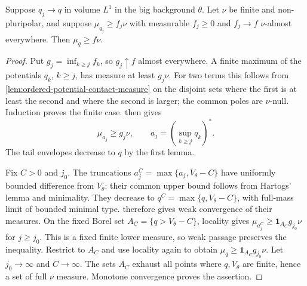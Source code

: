 \begin{lemma}\label{lem:nonpluripolar-measure-lower-bound-lone-limit}
Suppose $q_j\to q$ in volume $L^1$ in the big background $\theta$. Let $\nu$ be finite and non-pluripolar, and suppose
$\mu_{q_j}\geq f_j\nu$ with measurable $f_j\geq0$ and $f_j\to f$ $\nu$-almost everywhere. Then $\mu_q\geq f\nu$.
\end{lemma}
\begin{proof}
Put $g_j=\inf_{k\geq j}f_k$, so $g_j\uparrow f$ almost everywhere. A finite maximum of the potentials $q_k$, $k\geq j$, has measure at least $g_j\nu$. For two terms this follows from \cref{lem:ordered-potential-contact-measure} on the disjoint sets where the first is at least the second and where the second is larger; the common poles are $\nu$-null. Induction proves the finite case.  then gives
\[
 \mu_{a_j}\geq g_j\nu,\qquad
              a_j=(\sup_{k\geq j}q_k)^*.
\]
The tail envelopes decrease to $q$ by the first lemma.

Fix $C>0$ and $j_0$. The truncations
$a_j^C=\max\{a_j,V_\theta-C\}$ have uniformly bounded difference from $V_\theta$: their common upper bound follows from Hartogs' lemma and minimality. They decrease to $q^C=\max\{q,V_\theta-C\}$, with full-mass limit of bounded minimal type.  therefore gives weak convergence of their measures. On the fixed Borel set $A_C=\{q>V_\theta-C\}$, locality gives
$\mu_{a_j^C}\geq\mathbf1_{A_C}g_{j_0}\nu$ for $j\geq j_0$. This is a fixed finite lower measure, so weak passage preserves the inequality. Restrict to $A_C$ and use locality again to obtain
$\mu_q\geq\mathbf1_{A_C}g_{j_0}\nu$.
Let $j_0\to\infty$ and $C\to\infty$. The sets $A_C$ exhaust all points where $q,V_\theta$ are finite, hence a set of full $\nu$ measure. Monotone convergence proves the assertion.
\end{proof}

